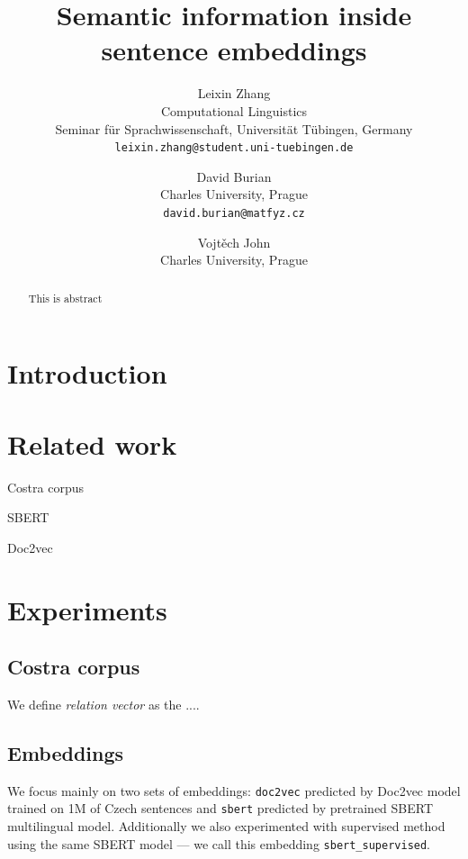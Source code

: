 \documentclass[11pt]{article}
\title{Semantic information inside sentence embeddings}
\author{Leixin Zhang \\ 
    Computational Linguistics\\
    Seminar für Sprachwissenschaft,
    Universität Tübingen, Germany \\ 
    \texttt{leixin.zhang@student.uni-tuebingen.de}
    }
\author{David Burian\\
  Charles University, Prague\\
  \texttt{david.burian@matfyz.cz}
  }
\author{Vojtěch John\\
 Charles University, Prague\\
 }
\newcommand{\Embed}[1]{\texttt{#1}}
\begin{document}
\maketitle

\begin{abstract}
This is abstract
\end{abstract}

\section{Introduction}

\section{Related work}

Costra corpus~\cite{baranvcikova2020costra}

SBERT~\cite{reimers2019sentence}

Doc2vec~\cite{le2014distributed}


\section{Experiments}

\subsection{Costra corpus}


We define \emph{relation vector} as the ....

\subsection{Embeddings}\label{sec:embeddings}

We focus mainly on two sets of embeddings: \Embed{doc2vec} predicted by Doc2vec
model trained on 1M of Czech sentences and \Embed{sbert} predicted by
pretrained SBERT multilingual model. Additionally we also experimented with
supervised method using the same SBERT model --- we call this embedding
\Embed{sbert\_supervised}.
\end{document}
